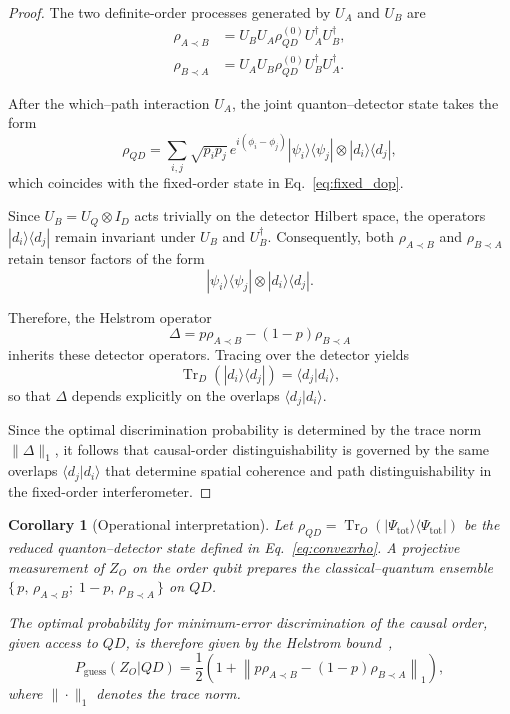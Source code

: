 \documentclass[aps,pra,reprint,superscriptaddress]{revtex4-2}
\newtheorem{corollary}[theorem]{Corollary}
\begin{document}
\begin{proof}
The two definite-order processes generated by $U_A$ and $U_B$ are
\begin{align}
\rho_{A\prec B} & = U_B U_A \rho^{(0)}_{QD} U_A^\dagger U_B^\dagger,\\
\rho_{B\prec A} & = U_A U_B \rho^{(0)}_{QD} U_B^\dagger U_A^\dagger .
\end{align}

After the which--path interaction $U_A$, the joint quanton--detector state takes the form
\begin{equation}
\rho_{QD} =
\sum_{i,j} \sqrt{p_i p_j}\, e^{i(\phi_i-\phi_j)}
|\psi_i\rangle\langle\psi_j|
\otimes
|d_i\rangle\langle d_j|,
\end{equation}
which coincides with the fixed-order state in Eq.~\eqref{eq:fixed_dop}.

Since $U_B = U_Q \otimes I_D$ acts trivially on the detector Hilbert space, the operators $|d_i\rangle\langle d_j|$ remain invariant under $U_B$ and $U_B^\dagger$. Consequently, both $\rho_{A\prec B}$ and $\rho_{B\prec A}$ retain tensor factors of the form
\[
|\psi_i\rangle\langle\psi_j|\otimes|d_i\rangle\langle d_j|.
\]

Therefore, the Helstrom operator
\[
\Delta = p\rho_{A\prec B}-(1-p)\rho_{B\prec A}
\]
inherits these detector operators. Tracing over the detector yields
\[
\operatorname{Tr}_D\!\left(|d_i\rangle\langle d_j|\right)
= \langle d_j|d_i\rangle,
\]
so that $\Delta$ depends explicitly on the overlaps $\langle d_j|d_i\rangle$.

Since the optimal discrimination probability is determined by the trace norm $\|\Delta\|_1$, it follows that causal-order distinguishability is governed by the same overlaps $\langle d_j|d_i\rangle$ that determine spatial coherence and path distinguishability in the fixed-order interferometer.
\end{proof}

\begin{corollary}[Operational interpretation]
Let $\rho_{QD}=\operatorname{Tr}_O(|\Psi_{\mathrm{tot}}\rangle\langle\Psi_{\mathrm{tot}}|)$ 
be the reduced quanton--detector state defined in Eq.~\eqref{eq:convexrho}. 
A projective measurement of $Z_O$ on the order qubit prepares the classical--quantum ensemble 
$\{\, p,\, \rho_{A\prec B};\; 1-p,\, \rho_{B\prec A} \,\}$ on $QD$.

The optimal probability for minimum-error discrimination of the causal order, given access to $QD$, is therefore given by the Helstrom bound~\cite{Helstrom1976,Bergou2010},
\begin{equation}
P_{\mathrm{guess}}(Z_O|QD)
=
\frac12
\left(
1 +
\left\|
p\rho_{A\prec B}
-
(1-p)\rho_{B\prec A}
\right\|_1
\right),
\label{eq:helstrom_operator}
\end{equation}
where $\|\cdot\|_1$ denotes the trace norm.
\end{corollary}
\end{document}
